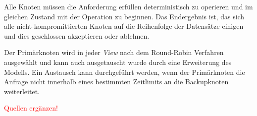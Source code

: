 Alle Knoten müssen die Anforderung erfüllen deterministisch zu operieren und im gleichen Zustand mit der Operation zu beginnen. Das Endergebnis ist, das sich alle nicht-kompromittierten Knoten auf die Reihenfolge der Datensätze einigen und dies geschlossen akzeptieren oder ablehnen.

Der Primärknoten wird in jeder \textit{View} nach dem Round-Robin Verfahren ausgewählt und kann auch ausgetauscht wurde durch eine Erweiterung des Modells. Ein Austausch kann durchgeführt werden, wenn der Primärknoten die Anfrage nicht innerhalb eines bestimmten Zeitlimits an die Backupknoten weiterleitet.

\textcolor{red}{Quellen ergänzen!}
